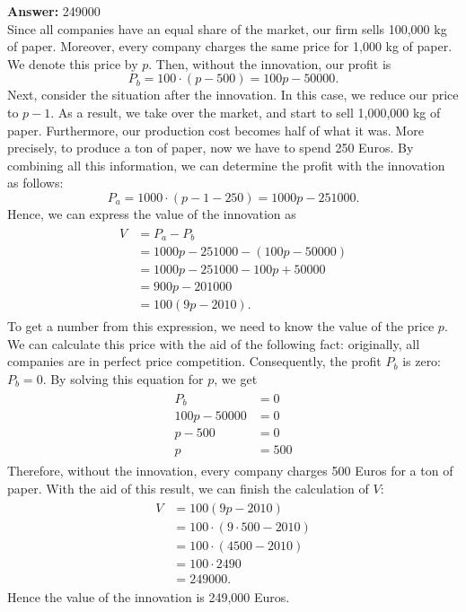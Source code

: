 \documentclass[11pt]{article}
\begin{document}
\textbf{Answer:} 249000\\

Since all companies have an equal share of the market, our firm sells
100,000 kg of paper. Moreover, every company charges the same price for
1,000 kg of paper. We denote this price by \(p\). Then, without the
innovation, our profit is
\begin{equation*}
P_b=100\cdot(p-500)=100p-50000.
\end{equation*}
Next, consider the situation after the innovation. In this case, we reduce
our price to \(p-1\). As a result, we take over the market, and start to
sell 1,000,000 kg of paper. Furthermore, our production cost becomes half
of what it was. More precisely, to produce a ton of paper, now we have to
spend 250 Euros. By combining all this information, we can determine the
profit with the innovation as follows:
\begin{equation*}
P_a=1000\cdot(p-1-250)=1000p-251000.
\end{equation*}
Hence, we can express the value of the innovation as
\begin{align*}
  \begin{split}
    V&=P_a-P_b\\
    &=1000p-251000-(100p-50000)\\
    &=1000p-251000-100p+50000\\
    &=900p-201000\\
    &=100(9p-2010).
  \end{split}
\end{align*}
To get a number from this expression, we need to know the value of the
price \(p\). We can calculate this price with the aid of the following
fact: originally, all companies are in perfect price competition.
Consequently, the profit \(P_b\) is zero: \(P_b=0\). By solving this
equation for \(p\), we get
\begin{align*}
  \begin{split}
    P_b&=0\\
    100p-50000&=0\\
    p-500&=0\\
    p&=500
  \end{split}
\end{align*}
Therefore, without the innovation, every company charges 500 Euros for a
ton of paper. With the aid of this result, we can finish the calculation of
\(V\):
\begin{align*}
  \begin{split}
    V&=100(9p-2010)\\
    &=100\cdot(9\cdot 500-2010)\\
    &=100\cdot(4500-2010)\\
    &=100\cdot 2490\\
    &=249000.
  \end{split}
\end{align*}
Hence the value of the innovation is 249,000 Euros.
\end{document}
